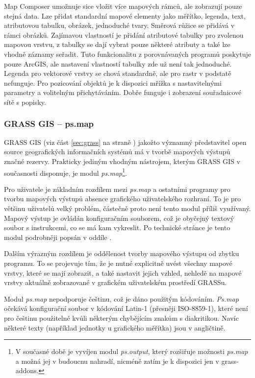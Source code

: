 \documentclass[a4paper,12pt,draft]{article}
\newcommand{\modul}[1]{\emph{#1}}
\begin{document}
Map Composer umožnuje sice vložit více mapových rámců, ale zobrazují pouze stejná data. Lze přidat standardní mapové elementy jako měřítko, legenda, text, atributovou tabulku, obrázek, jednoduché tvary. Směrová růžice se přidává v rámci obrázků. Zajímavou vlastností je přidání atributové tabulky pro zvolenou mapovou vrstvu, z tabulky se dají vybrat pouze některé atributy a také lze vhodně záznamy seřadit. Tuto funkcionalitu z porovnávaných programů poskytuje pouze ArcGIS, ale nastavení vlastností tabulky zde už není tak jednoduché. Legenda pro vektorové vrstvy se chová standardně, ale pro rastr v podstatě nefunguje. Pro pozicování objektů je k dispozici mřížka s nastavitelnými parametry a volitelným přichytáváním. Dobře funguje i zobrazení souřadnicové sítě s popisky.



\subsubsection{GRASS GIS -- ps.map}
\label{sec:porovnani:psmap}
GRASS GIS (viz část \ref{sec:grass} na straně \pageref{sec:grass}) jakožto významný představitel open source geografických informačních systémů má v tvorbě mapových výstupů značné rezervy. Prakticky jediným vhodným nástrojem, kterým GRASS GIS v současnosti disponuje, je modul \modul{ps.map}\footnote{V současné době je vyvíjen modul \modul{ps.output}, který rozšiřuje možnosti \modul{ps.map} a možná jej v budoucnu nahradí, nicméně zatím je k dispozici jen v grass-addons.}.

Pro uživatele je základním rozdílem mezi \modul{ps.map} a ostatními programy pro tvorbu mapových výstupů  absence grafického uživatelského rozhraní. To je pro většinu uživatelů velký problém, částečně proto není tento modul příliš využívaný. Mapový výstup je ovládán konfiguračním souborem, což je obyčejný textový soubor s instrukcemi, co se má kam vykreslit. Po technické stránce je tento modul podrobněji  popsán v oddíle .

Dalším výrazným rozdílem je oddělenost tvorby mapového výstupu od zbytku programu. To se projevuje tím, že je nutné explicitně uvést všechny mapové vrstvy, které se mají zobrazit, a také nastavit jejich vzhled, nehledě na mapové vrstvy aktuálně zobrazované  v grafickém uživatelském prostředí GRASSu.

Modul \modul{ps.map} nepodporuje češtinu, což je dáno použitým kódováním. \modul{Ps.map} očekává konfigurační soubor v kódování Latin-1 (přesněji ISO-8859-1), které není pro češtinu použitelné kvůli některým chybějícím znakům s diakritikou. Navíc některé texty (například jednotky u grafického měřítka) jsou v angličtině.
\end{document}
